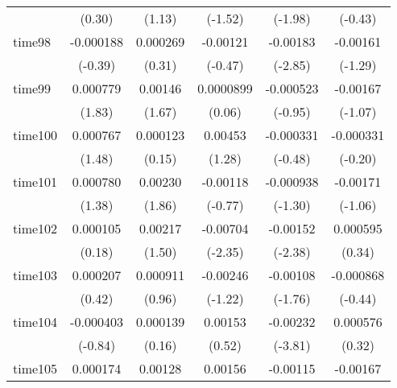 \begin{table}[htbp]
\begin{tabular}{l*{5}{c}}
            &      (0.30)         &      (1.13)         &     (-1.52)         &     (-1.98)         &     (-0.43)         \\
time98      &   -0.000188         &    0.000269         &    -0.00121         &    -0.00183\sym{**} &    -0.00161         \\
            &     (-0.39)         &      (0.31)         &     (-0.47)         &     (-2.85)         &     (-1.29)         \\
time99      &    0.000779         &     0.00146         &   0.0000899         &   -0.000523         &    -0.00167         \\
            &      (1.83)         &      (1.67)         &      (0.06)         &     (-0.95)         &     (-1.07)         \\
time100     &    0.000767         &    0.000123         &     0.00453         &   -0.000331         &   -0.000331         \\
            &      (1.48)         &      (0.15)         &      (1.28)         &     (-0.48)         &     (-0.20)         \\
time101     &    0.000780         &     0.00230         &    -0.00118         &   -0.000938         &    -0.00171         \\
            &      (1.38)         &      (1.86)         &     (-0.77)         &     (-1.30)         &     (-1.06)         \\
time102     &    0.000105         &     0.00217         &    -0.00704\sym{*}  &    -0.00152\sym{*}  &    0.000595         \\
            &      (0.18)         &      (1.50)         &     (-2.35)         &     (-2.38)         &      (0.34)         \\
time103     &    0.000207         &    0.000911         &    -0.00246         &    -0.00108         &   -0.000868         \\
            &      (0.42)         &      (0.96)         &     (-1.22)         &     (-1.76)         &     (-0.44)         \\
time104     &   -0.000403         &    0.000139         &     0.00153         &    -0.00232\sym{***}&    0.000576         \\
            &     (-0.84)         &      (0.16)         &      (0.52)         &     (-3.81)         &      (0.32)         \\
time105     &    0.000174         &     0.00128         &     0.00156         &    -0.00115         &    -0.00167         \\

\end{tabular}
\end{table}
